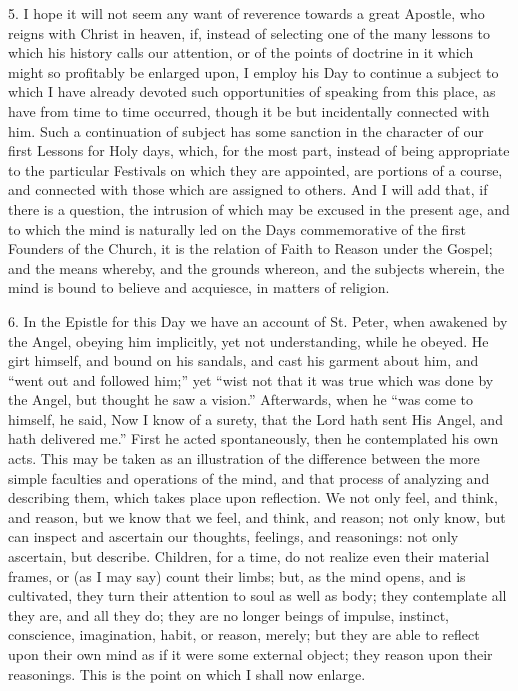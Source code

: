 5. I hope it will not seem any want of reverence towards a great
Apostle, who reigns with Christ in heaven, if, instead of selecting
one of the many lessons to which his history calls our attention, or
of the points of doctrine in it which might so profitably be enlarged
upon, I employ his Day to continue a subject to which I have already
devoted such opportunities of speaking from this place, as have from
time to time occurred, though it be but incidentally connected with
him. Such a continuation of subject has some sanction in the character
of our first Lessons for Holy days, which, for the most part, instead
of being appropriate to the particular Festivals on which they are
appointed, are portions of a course, and connected with those which
are assigned to others. And I will add that, if there is a question,
the intrusion of which may be excused in the present age, and to which
the mind is naturally led on the Days commemorative of the first
Founders of the Church, it is the relation of Faith to Reason under
the Gospel; and the means whereby, and the grounds whereon, and the
subjects wherein, the mind is bound to believe and acquiesce, in
matters of religion.

6. In the Epistle for this Day we have an account of St. Peter,
when awakened by the Angel, obeying him implicitly, yet not
understanding, while he obeyed. He girt himself, and bound on his
sandals, and cast his garment about him, and ``went out and
followed him;'' yet ``wist not that it was true which was done
by the Angel, but thought he saw a vision.'' Afterwards, when he
``was come to himself, he said, Now I know of a surety, that the
Lord hath sent His Angel, and hath delivered me.'' First he acted
spontaneously, then he contemplated his own acts. This may be taken as
an illustration of the difference between the more simple faculties
and operations of the mind, and that process of analyzing and
describing them, which takes place upon reflection. We not only feel,
and think, and reason, but we know that we feel, and think, and
reason; not only know, but can inspect and ascertain our thoughts,
feelings, and reasonings: not only ascertain, but describe. Children,
for a time, do not realize even their material frames, or (as I may
say) count their limbs; but, as the mind opens, and is cultivated,
they turn their attention to soul as well as body; they contemplate
all they are, and all they do; they are no longer beings of impulse,
instinct, conscience, imagination, habit, or reason, merely; but they
are able to reflect upon their own mind as if it were some external
object; they reason upon their reasonings. This is the point on which
I shall now enlarge.

